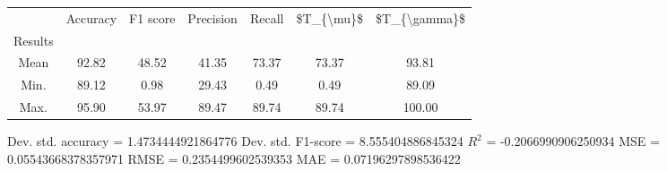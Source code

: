 \begin{tabular}{|c|c|c|c|c|c|c|}
\toprule
{} &  Accuracy &  F1 score &  Precision &  Recall &  \$T\_\{\textbackslash mu\}\$ &  \$T\_\{\textbackslash gamma\}\$ \\
Results &           &           &            &         &            &               \\
\hline
Mean    &     92.82 &     48.52 &      41.35 &   73.37 &      73.37 &         93.81 \\
Min.    &     89.12 &      0.98 &      29.43 &    0.49 &       0.49 &         89.09 \\
Max.    &     95.90 &     53.97 &      89.47 &   89.74 &      89.74 &        100.00 \\
\bottomrule
\end{tabular}

 Dev. std. accuracy = 1.4734444921864776
 Dev. std. F1-score = 8.555404886845324
 $R^2$ = -0.2066990906250934
 MSE = 0.05543668378357971
 RMSE = 0.2354499602539353
 MAE = 0.07196297898536422